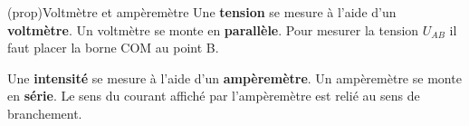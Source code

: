 \documentclass[../../main/main.tex]{subfiles}
\begin{document}
\begin{tcb}[label=prop:mesure, sidebyside, righthand ratio=.4](prop){Voltmètre et ampèremètre}
	Une \textbf{tension} se mesure à l'aide d'un \textbf{voltmètre}.
	\smallbreak
	Un voltmètre se monte en \textbf{parallèle}.
	\smallbreak
	Pour mesurer la tension $U_{AB}$ il faut placer la borne COM au point B.

	\bigbreak

	Une \textbf{intensité} se mesure à l'aide d'un \textbf{ampèremètre}.
	\smallbreak
	Un ampèremètre se monte en \textbf{série}.
	\smallbreak
	Le sens du courant affiché par l'ampèremètre est relié au sens de branchement.
	\tcblower
	\begin{center}
	\end{center}
	\begin{center}
\end{center}
\end{tcb}
\end{document}
